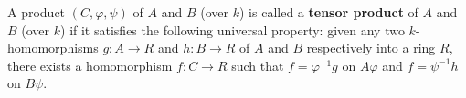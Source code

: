 A product $(C, \varphi, \psi)$ of $A$ and $B$ (over $k$) is called a \textbf{tensor product} of $A$ and $B$ (over $k$) if it satisfies the following universal property: given any two $k$-homomorphisms $g: A \to R$ and $h: B \to R$ of $A$ and $B$ respectively into a ring $R$, there exists a homomorphism $f: C \to R$ such that $f = \varphi^{-1}g$ on $A\varphi$ and $f = \psi^{-1}h$ on $B\psi$.
